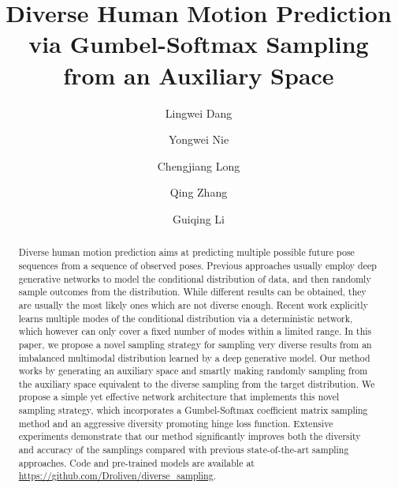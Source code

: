 \documentclass[sigconf,screen,nonacm]{acmart}
\begin{document}
	
\title{Diverse Human Motion Prediction via Gumbel-Softmax Sampling from an Auxiliary Space}
	


	\author{Lingwei Dang}


	\author{Yongwei Nie}
	
	\author{Chengjiang Long}
	
	\author{Qing Zhang}
	
	\author{Guiqing Li}


\begin{abstract}
		Diverse human motion prediction aims at predicting multiple possible future pose sequences from a sequence of observed poses. Previous approaches usually employ deep generative networks to model the conditional distribution of data, and then randomly sample outcomes from the distribution. While different results can be obtained, they are usually the most likely ones which are not diverse enough. Recent work explicitly learns multiple modes of the conditional distribution via a deterministic network, which however can only cover a fixed number of modes within a limited range. In this paper, we propose a novel sampling strategy for sampling very diverse results from an imbalanced multimodal distribution learned by a deep generative model. Our method works by generating an auxiliary space and smartly making randomly sampling from the auxiliary space equivalent to the diverse sampling from the target distribution. We propose a simple yet effective network architecture that implements this novel sampling strategy, which incorporates a Gumbel-Softmax coefficient matrix sampling method and an aggressive diversity promoting hinge loss function. Extensive experiments demonstrate that our method significantly improves both the diversity and accuracy of the samplings compared with previous state-of-the-art sampling approaches. Code and pre-trained models are available at \href{https://github.com/Droliven/diverse_sampling}{https://github.com/Droliven/diverse\_sampling}.
	\end{abstract}
	
\end{document}
